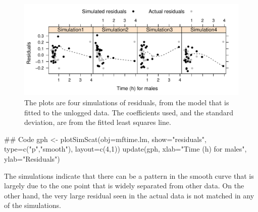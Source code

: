 \begin{figure}
\vspace*{-12pt}

\begin{Schunk}


\centerline{\includegraphics[width=\textwidth]{figs/8-simscat-1} }

\end{Schunk}
\caption{The plots are four simulations of residuals, from the
  model that is fitted to the unlogged data.  The coefficients
  used, and the standard deviation, are from the fitted least squares
  line.\label{fig:4sim-mftimeres1}}
%
\end{figure}
\begin{Schunk}
\begin{Sinput}
## Code
gph <- plotSimScat(obj=mftime.lm, show="residuals",
                   type=c("p","smooth"),
                   layout=c(4,1))
update(gph, xlab="Time (h) for males",
      ylab="Residuals")
\end{Sinput}
\end{Schunk}

The simulations indicate that there can be a pattern in the smooth
curve that is largely due to the one point that is widely separated
from other data. On the other hand, the very large residual seen in
the actual data is not matched in any of the simulations.

